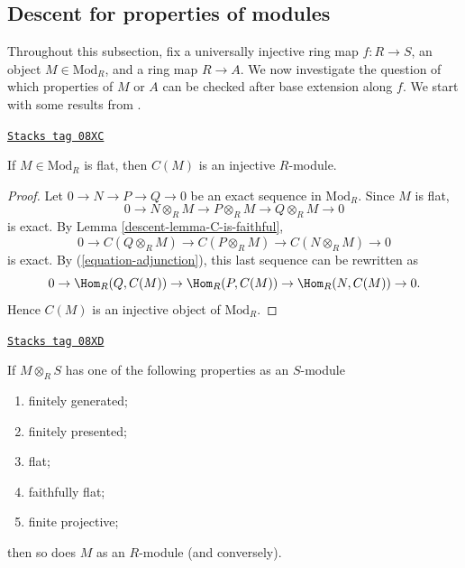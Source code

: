 \subsection{Descent for properties of modules}
\label{descent-subsection-descent-properties-modules}

Throughout this subsection, fix a universally injective ring map $f : R \to S$,
an object $M \in \text{Mod}_R$, and a ring map $R \to A$. We now investigate
the question of which properties of $M$ or $A$ can be checked after base
extension along $f$. We start with some results from
\cite{mesablishvili2}.

\begin{lemma}
\label{descent-lemma-flat-to-injective}
\href{https://stacks.math.columbia.edu/tag/08XC}{\texttt{Stacks tag 08XC}}

If $M \in \text{Mod}_R$ is flat, then $C(M)$ is an injective $R$-module.
\end{lemma}

\begin{proof}

Let $0 \to N \to P \to Q \to 0$ be an exact sequence in $\text{Mod}_R$. Since
$M$ is flat,
$$
0 \to N \otimes_R M \to P \otimes_R M \to Q \otimes_R M \to 0
$$
is exact.
By Lemma \ref{descent-lemma-C-is-faithful},
$$
0 \to C(Q \otimes_R M) \to C(P \otimes_R M) \to C(N \otimes_R M) \to 0
$$
is exact. By (\ref{equation-adjunction}), this last sequence can be rewritten
as
$$
0 \to \Hom_R(Q, C(M)) \to \Hom_R(P, C(M)) \to \Hom_R(N, C(M)) \to 0.
$$
Hence $C(M)$ is an injective object of $\text{Mod}_R$.
\end{proof}

\begin{theorem}
\label{descent-theorem-descend-module-properties}
\href{https://stacks.math.columbia.edu/tag/08XD}{\texttt{Stacks tag 08XD}}

If $M \otimes_R S$ has one of the following properties as an $S$-module
\begin{enumerate}
\item[(a)]
finitely generated;
\item[(b)]
finitely presented;
\item[(c)]
flat;
\item[(d)]
faithfully flat;
\item[(e)]
finite projective;
\end{enumerate}
then so does $M$ as an $R$-module (and conversely).
\end{theorem}

